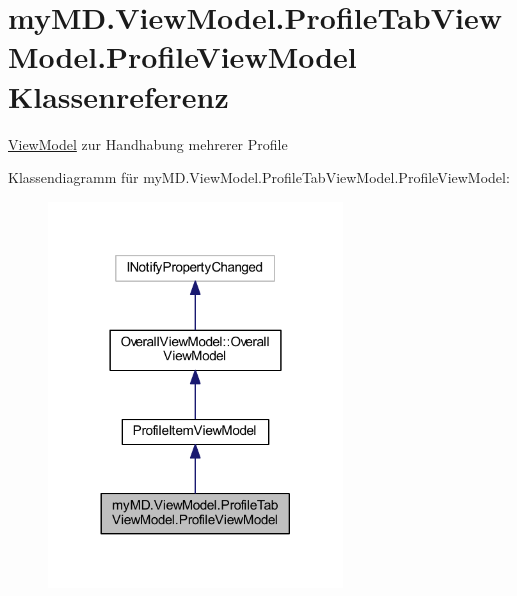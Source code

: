 \hypertarget{classmy_m_d_1_1_view_model_1_1_profile_tab_view_model_1_1_profile_view_model}{}\section{my\+M\+D.\+View\+Model.\+Profile\+Tab\+View\+Model.\+Profile\+View\+Model Klassenreferenz}
\label{classmy_m_d_1_1_view_model_1_1_profile_tab_view_model_1_1_profile_view_model}


\mbox{\hyperlink{namespacemy_m_d_1_1_view_model}{View\+Model}} zur Handhabung mehrerer Profile  




Klassendiagramm für my\+M\+D.\+View\+Model.\+Profile\+Tab\+View\+Model.\+Profile\+View\+Model\+:\nopagebreak
\begin{figure}[H]
\begin{center}
\leavevmode
\includegraphics[width=221pt]{classmy_m_d_1_1_view_model_1_1_profile_tab_view_model_1_1_profile_view_model__inherit__graph}
\end{center}
\end{figure}


